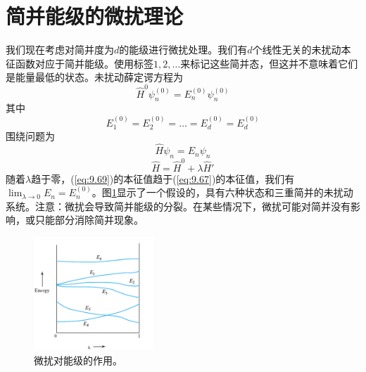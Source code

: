 \section{简并能级的微扰理论}
\label{sec:9.5 Perturbation Theory for a Degenerate Energy Level}
    我们现在考虑对简并度为$d$的能级进行微扰处理。我们有$d$个线性无关的未扰动本征函数对应于简并能级。使用标签$1,2,\ldots$来标记这些简并态，但这并不意味着它们是能量最低的状态。未扰动薛定谔方程为
    \begin{equation}
        \hat{H}^0\psi_n^{\left(0\right)} = E_n^{\left(0\right)}\psi_n^{\left(0\right)}
        \label{eq:9.67}
    \end{equation}
    其中
    \begin{equation}
        E_1^{\left(0\right)} = E_2^{\left(0\right)} = \ldots = E_d^{\left(0\right)} = E_d^{\left(0\right)}
        \label{eq:9.68}
    \end{equation}
    围绕问题为
    \begin{equation}
        \hat{H}\psi_n = E_n \psi_n
        \label{eq:9.69}
    \end{equation}
    \begin{equation}
        \hat{H} = \hat{H}^0 + \lambda\hat{H}'
        \label{eq:9.70}
    \end{equation}
    随着$\lambda$趋于零，(\ref{eq:9.69})的本征值趋于(\ref{eq:9.67})的本征值，我们有$\lim_{\lambda \to 0} E_n = E_n^{\left(0\right)}$。图\ref{fig:9.2}显示了一个假设的，具有六种状态和三重简并的未扰动系统。注意：微扰会导致简并能级的分裂。在某些情况下，微扰可能对简并没有影响，或只能部分消除简并现象。
    \begin{figure}[h!]
        \centering
        \includegraphics[width=0.4\textwidth]{Figures/9.2.png}
        \caption{微扰对能级的作用。}
        \label{fig:9.2}
    \end{figure}

